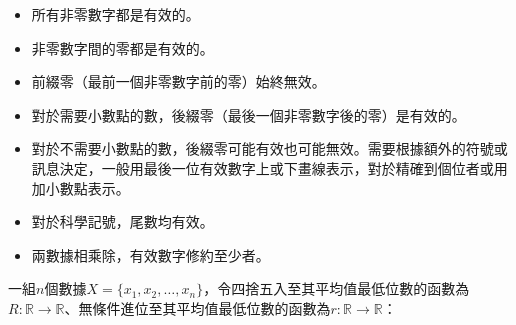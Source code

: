 \documentclass[a4paper,12pt]{article}
\begin{document}
\begin{itemize}
\item 所有非零數字都是有效的。
\item 非零數字間的零都是有效的。
\item 前綴零（最前一個非零數字前的零）始終無效。
\item 對於需要小數點的數，後綴零（最後一個非零數字後的零）是有效的。
\item 對於不需要小數點的數，後綴零可能有效也可能無效。需要根據額外的符號或訊息決定，一般用最後一位有效數字上或下畫線表示，對於精確到個位者或用加小數點表示。
\item 對於科學記號，尾數均有效。
\item 兩數據相乘除，有效數字修約至少者。
\end{itemize}
一組$n$個數據$X=\{x_1,x_2,\ldots,x_n\}$，令四捨五入至其平均值最低位數的函數為$R\colon\mathbb{R}\to\mathbb{R}$、無條件進位至其平均值最低位數的函數為$r\colon\mathbb{R}\to\mathbb{R}$：
\end{document}
